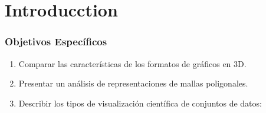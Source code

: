 \documentclass{beamer}
\begin{document}
\section{Introducction} %
\begin{frame}
\frametitle{Objetivos Espec\' ificos} 
\begin{enumerate}
\item Comparar las caracter\' isticas de los formatos de gr\' aficos en 3D.
\item Presentar un an\' alisis de representaciones de mallas poligonales.

%

\item Describir los tipos de visualizaci\' on cient\' ifica de conjuntos de datos:
	
\end{enumerate}
\end{frame}
\end{document}
